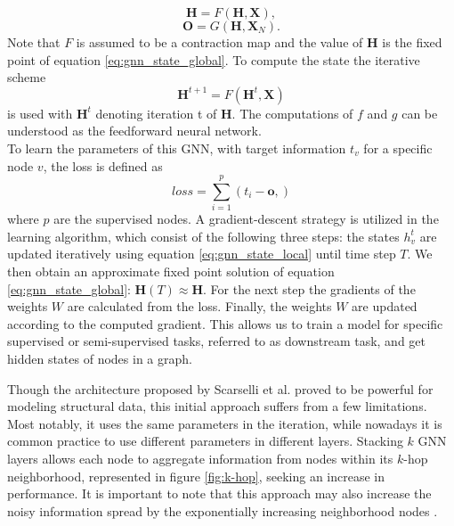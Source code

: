 \begin{equation}
    \mathbf{H} = F(\mathbf{H}, \mathbf{X}),
    \label{eq:gnn_state_global}
\end{equation}
\begin{equation}
    \mathbf{O} = G(\mathbf{H},\mathbf{X}_N).
\end{equation}
Note that $F$ is assumed to be a contraction map and the value of $\mathbf{H}$ is the fixed point of equation \eqref{eq:gnn_state_global}. To compute the state the iterative scheme
\begin{equation}
    \label{eq:GNN_iterations}
    \mathbf{H}^{t+1} = F(\mathbf{H}^t, \mathbf{X})
\end{equation}
is used with $\mathbf{H}^t$ denoting iteration t of $\mathbf{H}$. The computations of $f$ and $g$ can be understood as the feedforward neural network. \\
To learn the parameters of this GNN, with target information $t_v$ for a specific node $v$, the loss is defined as
\begin{equation}
    loss = \sum_{i=1}^p (t_i-\mathbf{o},)
\end{equation}
where $p$ are the supervised nodes. A gradient-descent strategy is utilized in the learning algorithm, which consist of the following three steps: the states $h_v^t$ are updated iteratively using equation \eqref{eq:gnn_state_local} until time step $T$. We then obtain an approximate fixed point solution of equation \eqref{eq:gnn_state_global}: $\mathbf{H}(T)\approx\mathbf{H}$. For the next step the gradients of the weights $W$ are calculated from the loss. Finally, the weights $W$ are updated according to the computed gradient. This allows us to train a model for specific supervised or semi-supervised tasks, referred to as downstream task, and get hidden states of nodes in a graph. \bigskip

Though the architecture proposed by Scarselli et al. \cite{4700287} proved to be powerful for modeling structural data, this initial approach suffers from a few limitations. Most notably, it uses the same parameters in the iteration, while nowadays it is common practice to use different parameters in different layers. Stacking $k$ GNN layers allows each node to aggregate information from nodes within its $k$-hop neighborhood, represented in figure \ref{fig:k-hop}, seeking an increase in performance. It is important to note that this approach may also increase the noisy information spread by the exponentially increasing neighborhood nodes \cite{Liu2020}.

